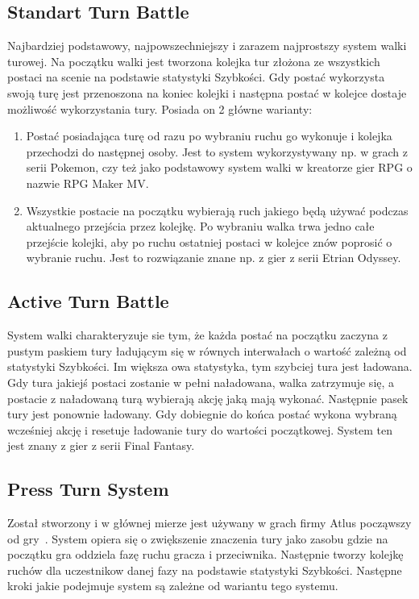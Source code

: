 \documentclass{SGGW-thesis}
\begin{document}
\subsection{Standart Turn Battle}
Najbardziej podstawowy, najpowszechniejszy i zarazem najprostszy system walki turowej. Na początku walki jest tworzona kolejka tur złożona ze wszystkich postaci na scenie na podstawie statystyki Szybkości.
Gdy postać wykorzysta swoją turę jest przenoszona na koniec kolejki i następna postać w kolejce dostaje możliwość wykorzystania tury. Posiada on 2 główne warianty:
\begin{enumerate}
  \item{Postać posiadająca turę od razu po wybraniu ruchu go wykonuje i kolejka przechodzi do następnej osoby. Jest to system wykorzystywany np. w grach z serii Pokemon, czy też jako podstawowy system walki w kreatorze gier RPG o nazwie RPG Maker MV.}
  \item{Wszystkie postacie na początku wybierają ruch jakiego będą używać podczas aktualnego przejścia przez kolejkę. Po wybraniu walka trwa jedno całe przejście kolejki, aby po ruchu ostatniej postaci w kolejce znów poprosić o wybranie ruchu. Jest to rozwiązanie znane np. z gier z serii Etrian Odyssey.}
\end{enumerate}
\subsection{Active Turn Battle}
System walki charakteryzuje sie tym, że każda postać na początku zaczyna z pustym paskiem tury ładującym się w równych interwałach o wartość zależną od statystyki Szybkości. Im większa owa statystyka, tym szybciej tura jest ładowana.
Gdy tura jakiejś postaci zostanie w pełni naładowana, walka zatrzymuje się, a postacie z naładowaną turą wybierają akcję jaką mają wykonać. Następnie pasek tury jest ponownie ładowany. Gdy dobiegnie do końca postać wykona wybraną wcześniej akcję i resetuje ładowanie tury do wartości początkowej.
System ten jest znany z gier z serii Final Fantasy.
\subsection{Press Turn System}
Został stworzony i w głównej mierze jest używany w grach firmy Atlus począwszy od gry~\cite{SMT3}. System opiera się o zwiększenie znaczenia tury jako zasobu gdzie na początku gra oddziela fazę ruchu gracza i przeciwnika. Następnie tworzy kolejkę ruchów dla uczestnikow danej fazy na podstawie statystyki Szybkości.
Następne kroki jakie podejmuje system są zależne od wariantu tego systemu. 
\end{document}
